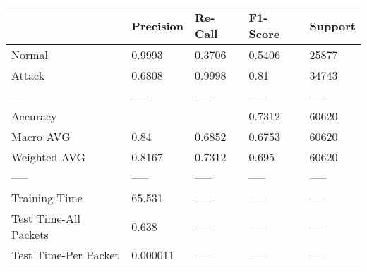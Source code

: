 \begin{tabular}{lllll}
\toprule
{} & Precision & Re-Call & F1-Score & Support \\
\midrule
Normal                &    0.9993 &  0.3706 &   0.5406 &   25877 \\
Attack                &    0.6808 &  0.9998 &     0.81 &   34743 \\
-----                 &     ----- &   ----- &    ----- &   ----- \\
Accuracy              &           &         &   0.7312 &   60620 \\
Macro AVG             &      0.84 &  0.6852 &   0.6753 &   60620 \\
Weighted AVG          &    0.8167 &  0.7312 &    0.695 &   60620 \\
-----                 &     ----- &   ----- &    ----- &   ----- \\
Training Time         &    65.531 &   ----- &    ----- &   ----- \\
Test Time-All Packets &     0.638 &   ----- &    ----- &   ----- \\
Test Time-Per Packet  &  0.000011 &   ----- &    ----- &   ----- \\
\bottomrule
\end{tabular}
